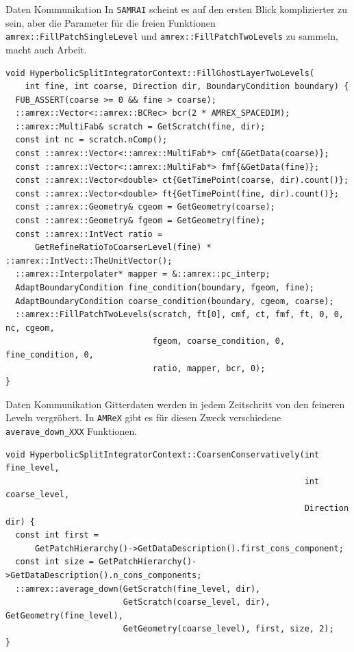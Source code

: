 \documentclass[ucs,9pt]{beamer}
\begin{document}
\begin{frame}[fragile]{Daten Kommunikation}
In \texttt{SAMRAI} scheint es auf den ersten Blick komplizierter zu sein, aber die Parameter für die freien Funktionen
\texttt{amrex::FillPatchSingleLevel} und \texttt{amrex::FillPatchTwoLevels} zu sammeln, macht auch Arbeit.
\begin{lstlisting}
void HyperbolicSplitIntegratorContext::FillGhostLayerTwoLevels(
    int fine, int coarse, Direction dir, BoundaryCondition boundary) {
  FUB_ASSERT(coarse >= 0 && fine > coarse);
  ::amrex::Vector<::amrex::BCRec> bcr(2 * AMREX_SPACEDIM);
  ::amrex::MultiFab& scratch = GetScratch(fine, dir);
  const int nc = scratch.nComp();
  const ::amrex::Vector<::amrex::MultiFab*> cmf{&GetData(coarse)};
  const ::amrex::Vector<::amrex::MultiFab*> fmf{&GetData(fine)};
  const ::amrex::Vector<double> ct{GetTimePoint(coarse, dir).count()};
  const ::amrex::Vector<double> ft{GetTimePoint(fine, dir).count()};
  const ::amrex::Geometry& cgeom = GetGeometry(coarse);
  const ::amrex::Geometry& fgeom = GetGeometry(fine);
  const ::amrex::IntVect ratio = 
      GetRefineRatioToCoarserLevel(fine) * ::amrex::IntVect::TheUnitVector();
  ::amrex::Interpolater* mapper = &::amrex::pc_interp;
  AdaptBoundaryCondition fine_condition(boundary, fgeom, fine);
  AdaptBoundaryCondition coarse_condition(boundary, cgeom, coarse);
  ::amrex::FillPatchTwoLevels(scratch, ft[0], cmf, ct, fmf, ft, 0, 0, nc, cgeom,
                              fgeom, coarse_condition, 0, fine_condition, 0,
                              ratio, mapper, bcr, 0);
}
\end{lstlisting}
\end{frame}

\begin{frame}[fragile]{Daten Kommunikation}
Gitterdaten werden in jedem Zeitschritt von den feineren Leveln vergröbert. In \texttt{AMReX} gibt es für diesen Zweck
verschiedene \texttt{averave\_down\_XXX} Funktionen.
\begin{lstlisting}
void HyperbolicSplitIntegratorContext::CoarsenConservatively(int fine_level,
                                                             int coarse_level,
                                                             Direction dir) {
  const int first =
      GetPatchHierarchy()->GetDataDescription().first_cons_component;
  const int size = GetPatchHierarchy()->GetDataDescription().n_cons_components;
  ::amrex::average_down(GetScratch(fine_level, dir),
                        GetScratch(coarse_level, dir), GetGeometry(fine_level),
                        GetGeometry(coarse_level), first, size, 2);
}
\end{lstlisting}
\end{frame}
\end{document}
